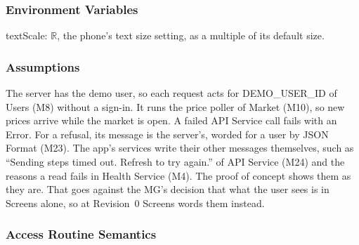 \documentclass[12pt, titlepage]{article}
\begin{document}
\subsubsection{Environment Variables}

\noindent textScale: $\mathbb{R}$, the phone's text size setting, as a
multiple of its default size.

\subsubsection{Assumptions}

The server has the demo user, so each request acts for DEMO\_USER\_ID of Users
(M8) without a sign-in. It runs the price poller of Market (M10), so new
prices arrive while the market is open. A failed API Service call fails with
an Error. For a refusal, its message is the server's, worded for a user by
JSON Format (M23). The app's services write their other messages
themselves, such as ``Sending steps timed out. Refresh to try again.'' of API
Service (M24) and the reasons a read fails in Health Service (M4). The proof
of concept shows them as they are. That goes against the MG's decision that
what the user sees is in Screens alone, so at Revision~0 Screens words them
instead.

\subsubsection{Access Routine Semantics}
\end{document}
